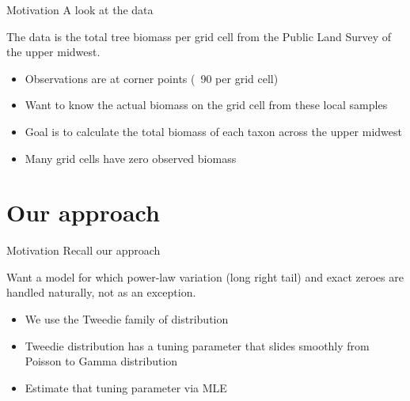\documentclass[12pt,t]{beamer}
\newcommand{\subt}[1]{{\footnotesize \color{subtitle} {#1}}}
\begin{document}
\begin{frame}{Motivation}
\subt{A look at the data}

The data is the total tree biomass per grid cell from the Public Land Survey of the upper midwest.

\begin{itemize}
    \item Observations are at corner points (~90 per grid cell)
    \item Want to know the actual biomass on the grid cell from these local samples
    \item Goal is to calculate the total biomass of each taxon across the upper midwest
    \item Many grid cells have zero observed biomass
\end{itemize}

\end{frame}





\section{Our approach}

\begin{frame}{Motivation}
\subt{Recall our approach}

Want a model for which power-law variation (long right tail) and exact zeroes are handled naturally, not as an exception.

\begin{itemize}
    \item We use the Tweedie family of distribution
    \item Tweedie distribution has a tuning parameter that slides smoothly from Poisson to Gamma distribution
    \item Estimate that tuning parameter via MLE
\end{itemize}

\end{frame}
\end{document}
